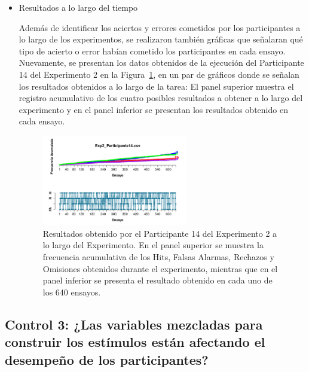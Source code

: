 \begin{itemize}
\item Resultados a lo largo del tiempo

Además de identificar los aciertos y errores cometidos por los participantes a lo largo de los experimentos, se realizaron también gráficas que señalaran qué tipo de acierto o error habían cometido los participantes en cada ensayo. Nuevamente, se presentan los datos obtenidos de la ejecución del Participante 14 del Experimento 2 en la Figura~\ref{fig:Outcome_E2_P14}, en un par de gráficos donde se señalan los resultados obtenidos a lo largo de la tarea: El panel superior muestra el registro acumulativo de los cuatro posibles resultados a obtener a lo largo del experimento y en el panel inferior se presentan los resultados obtenido en cada ensayo.\\ 

\begin{figure}[th]
\centering
\includegraphics[width=0.60\textwidth]{Figures/Outcome_Exp2_P14}
\caption[Resultado obtenido a lo largo del tiempo: Ejemplo]{Resultados obtenido por el Participante 14 del Experimento 2 a lo largo del Experimento. En el panel superior se muestra la frecuencia acumulativa de los  Hits, Falsas Alarmas, Rechazos y Omisiones obtenidos durante el experimento, mientras que en el panel inferior se presenta el resultado obtenido en cada uno de los 640 ensayos.}
\label{fig:Outcome_E2_P14}
\end{figure}


\end{itemize}











\subsection{Control 3: ¿Las variables mezcladas para construir los estímulos están afectando el desempeño de los participantes?}


